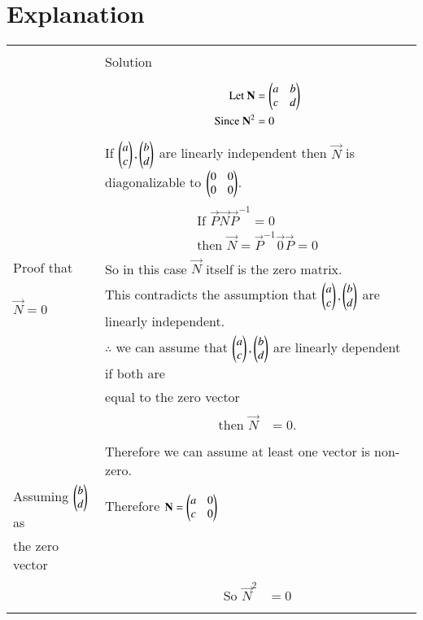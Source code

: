 \documentclass[journal,12pt]{IEEEtran}
\begin{document}
\section{\textbf{Explanation}}
\renewcommand{\thetable}{1}
\begin{longtable}{|l|l|}
\hline
\multirow{3}{*}{} & \\
Statement&Solution\\
\hline
&\parbox{6cm}{\begin{align}
\mbox{Let }\mathbf{N}&=\begin{pmatrix}a&b\\c&d\end{pmatrix}\\
\mbox{Since }\mathbf{N}^2&=0
\end{align}}\\
&If $\begin{pmatrix}a\\c\end{pmatrix},\begin{pmatrix}b\\d\end{pmatrix}$ are linearly independent then $\vec{N}$ is diagonalizable to $\begin{pmatrix}0&0\\0&0\end{pmatrix}$.\\
&\parbox{6cm}{\begin{align}
\mbox{If }\vec{P}\vec{N}\vec{P}^{-1}=0\\
\mbox{then }\vec{N}=\vec{P}^{-1}\vec{0}\vec{P}=0
\end{align}}\\
Proof that&So in this case $\vec{N}$ itself is the zero matrix.\\
$\vec{N}=0$&This contradicts the assumption that $\begin{pmatrix}a\\c\end{pmatrix},\begin{pmatrix}b\\d\end{pmatrix}$ are linearly independent.\\
&$\therefore$ we can assume that $\begin{pmatrix}a\\c\end{pmatrix},\begin{pmatrix}b\\d\end{pmatrix}$ are linearly dependent if both are\\
&equal to the zero vector\\
&\parbox{6cm}
{\begin{align}
   \mbox{then } \vec{N} &= 0.
\end{align}}\\
\hline
\pagebreak
\hline
&\\
&Therefore we can assume at least one vector is non-zero.\\
Assuming $\begin{pmatrix}b\\d\end{pmatrix}$ as&Therefore
$\mathbf{N}=\begin{pmatrix}a&0\\c&0\end{pmatrix}$\\
the zero vector&\\
&\parbox{6cm}{\begin{align}
\mbox{So }\vec{N}^2&=0\\

\end{align}}
\end{longtable}
\end{document}
